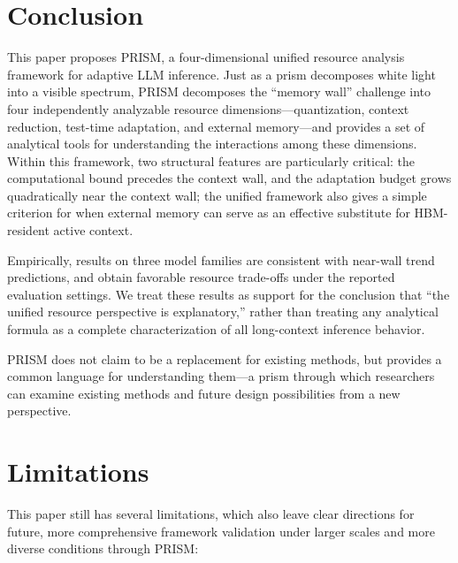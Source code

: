 \documentclass[11pt,a4paper]{article}
\theoremstyle{plain}
\theoremstyle{definition}
\begin{document}
\section{Conclusion}

This paper proposes PRISM, a four-dimensional unified resource analysis framework for adaptive LLM inference. Just as a prism decomposes white light into a visible spectrum, PRISM decomposes the ``memory wall'' challenge into four independently analyzable resource dimensions---quantization, context reduction, test-time adaptation, and external memory---and provides a set of analytical tools for understanding the interactions among these dimensions. Within this framework, two structural features are particularly critical: the computational bound precedes the context wall, and the adaptation budget grows quadratically near the context wall; the unified framework also gives a simple criterion for when external memory can serve as an effective substitute for HBM-resident active context.

Empirically, results on three model families are consistent with near-wall trend predictions, and obtain favorable resource trade-offs under the reported evaluation settings. We treat these results as support for the conclusion that ``the unified resource perspective is explanatory,'' rather than treating any analytical formula as a complete characterization of all long-context inference behavior.

PRISM does not claim to be a replacement for existing methods, but provides a common language for understanding them---a prism through which researchers can examine existing methods and future design possibilities from a new perspective.

\section{Limitations}

This paper still has several limitations, which also leave clear directions for future, more comprehensive framework validation under larger scales and more diverse conditions through PRISM:
\end{document}
